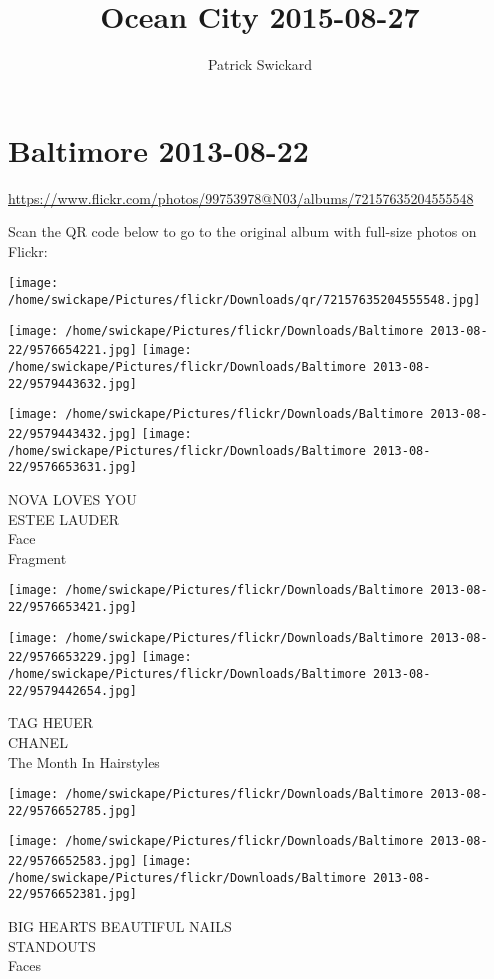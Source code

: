 \documentclass[10pt,letterpaper]{article}
\title{Ocean City 2015-08-27}
\author{Patrick Swickard}
\date{}
\begin{document}
\section*{Baltimore 2013-08-22}

\url{https://www.flickr.com/photos/99753978@N03/albums/72157635204555548}

Scan the QR code below to go to the original album with full-size photos on Flickr:

\texttt{[image: /home/swickape/Pictures/flickr/Downloads/qr/72157635204555548.jpg]}
\pagebreak

\texttt{[image: /home/swickape/Pictures/flickr/Downloads/Baltimore 2013-08-22/9576654221.jpg]}
\texttt{[image: /home/swickape/Pictures/flickr/Downloads/Baltimore 2013-08-22/9579443632.jpg]}

\texttt{[image: /home/swickape/Pictures/flickr/Downloads/Baltimore 2013-08-22/9579443432.jpg]}
\texttt{[image: /home/swickape/Pictures/flickr/Downloads/Baltimore 2013-08-22/9576653631.jpg]}

NOVA LOVES YOU\\
ESTEE LAUDER\\
Face\\
Fragment
\pagebreak

\texttt{[image: /home/swickape/Pictures/flickr/Downloads/Baltimore 2013-08-22/9576653421.jpg]}

\vspace{0.25in}
\texttt{[image: /home/swickape/Pictures/flickr/Downloads/Baltimore 2013-08-22/9576653229.jpg]}
\texttt{[image: /home/swickape/Pictures/flickr/Downloads/Baltimore 2013-08-22/9579442654.jpg]}

TAG HEUER\\
CHANEL\\
The Month In Hairstyles
\pagebreak

\texttt{[image: /home/swickape/Pictures/flickr/Downloads/Baltimore 2013-08-22/9576652785.jpg]}

\vspace{0.25in}
\texttt{[image: /home/swickape/Pictures/flickr/Downloads/Baltimore 2013-08-22/9576652583.jpg]}
\texttt{[image: /home/swickape/Pictures/flickr/Downloads/Baltimore 2013-08-22/9576652381.jpg]}

BIG HEARTS BEAUTIFUL NAILS\\
STANDOUTS\\
Faces
\pagebreak
\end{document}
